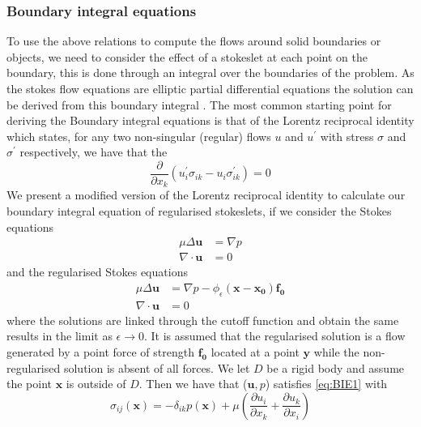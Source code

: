 \subsubsection{Boundary integral equations}
To use the above relations to compute the flows around solid boundaries or objects, we need to consider the effect of a stokeslet at each point on the boundary, this is done through an integral over the boundaries of the problem. As the stokes flow equations are elliptic partial differential equations the solution can be derived from this boundary integral \cite{Stakgold1968Boundary2,Pozrikidis1992BoundaryFlow}. The most common starting point for deriving the Boundary integral equations is that of the Lorentz reciprocal identity which states, for any two non-singular (regular) flows $u$ and $u^\prime$ with stress $\sigma$ and $\sigma^\prime$ respectively, we have that the 
\begin{equation*}
    \frac{\partial}{\partial x_k}(u_i^\prime\sigma_{ik} - u_i \sigma^\prime_{ik}) = 0
\end{equation*}
We present a modified version of the Lorentz reciprocal identity to calculate our boundary integral equation of regularised stokeslets, if we consider the Stokes equations
\begin{equation}
    \label{eq:BIE1}
\begin{aligned}
      \mu\Delta\boldsymbol{u} &= \nabla p \\
      \nabla \cdot \boldsymbol{u} &= 0
\end{aligned}
\end{equation}
and the regularised Stokes equations
\begin{equation}
    \label{eq:BIE2}
\begin{aligned}
      \mu\Delta\boldsymbol{u} &= \nabla p - \phi_{\epsilon}(\bm{x}-\bm{x_0})\bm{f_0} \\
      \nabla \cdot \boldsymbol{u} &= 0
\end{aligned}
\end{equation}
where the solutions are linked through the cutoff function and obtain the same results in the limit as $\epsilon \to 0$. It is assumed that the regularised solution is a flow generated by a point force of strength $\bm{f_0}$ located at a point $\bm{y}$ while the non-regularised solution is absent of all forces. We let $D$ be a rigid body and assume the point $\bm{x}$ is outside of $D$. Then we have that ($\bm{u},p$) satisfies \cref{eq:BIE1} with
\begin{equation*}
\sigma_{ij}(\bm{x}) = -\delta_{ik}p(\bm{x}) + \mu\left( \frac{\partial u_i}{\partial x_k} + \frac{\partial u_k}{\partial x_i} \right)
\end{equation*}

